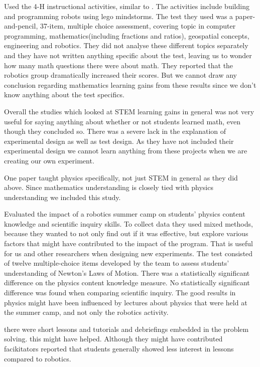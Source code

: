 \bigskip\noindent
\cite{nugent2009use} Used the 4-H instructional activities, similar to \cite{nugent2008effect}. The activities include building and programming robots using lego mindstorms. The test they used was a paper-and-pencil, 37-item, multiple choice assessment, covering topic in computer programming, mathematics(including fractions and ratios), geospatial concepts, engineering and robotics. They did not analyse these different topics separately and they have not written anything specific about the test, leaving us to wonder how many math questions there were about math. They reported that the robotics group dramatically increased their scores. But we cannot draw any conclusion regarding mathematics learning gains from these results since we don't know anything about the test specifics.

\bigskip\noindent
Overall the studies which looked at STEM learning gains in general was not very useful for saying anything about whether or not students learned math, even though they concluded so. There was a severe lack in the explanation of experimental design as well as test design. As they have not included their experimental design we cannot learn anything from these projects when we are creating our own experiment. 

\bigskip\noindent
One paper taught physics specifically, not just STEM in general as they did above. Since mathematics understanding is closely tied with physics understanding we included this study.

\bigskip\noindent
\cite{williams2007acquisition} Evaluated the impact of a robotics summer camp on students' physics content knowledge and scientific inquiry skills. To collect data they used mixed methods, because they wanted to not only find out if it was effective, but explore various factors that might have contributed to the impact of the program. That is useful for us and other researchers when designing new experiments. The test consisted of twelve multiple-choice items developed by the team to assess students' understanding of Newton's Laws of Motion. There was a statistically significant difference on the physics content knowledge measure. No statistically significant difference was found when comparing scientific inquiry. The good results in physics might have been influenced by lectures about physics that were held at the summer camp, and not only the robotics activity. 

\bigskip\noindent
\cite{williams2007acquisition} there were short lessons and tutorials and debriefings embedded in the problem solving. this might have helped. Although they might have contributed facikitators reported that students generally showed less interest in lessons compared to robotics. 

